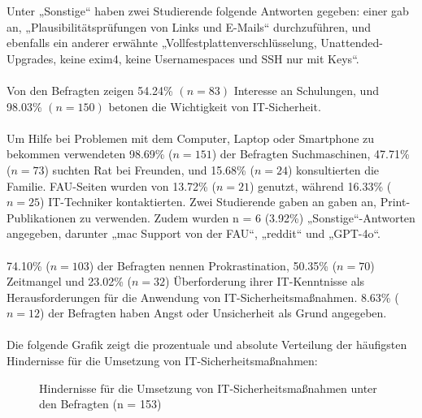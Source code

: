 \documentclass[german,report]{i1thesis}
\begin{document}
Unter „Sonstige“ haben zwei Studierende folgende Antworten gegeben: einer gab an, „Plausibilitätsprüfungen von Links und E-Mails“ durchzuführen, und ebenfalls ein anderer erwähnte „Vollfestplattenverschlüsselung, Unattended-Upgrades, keine exim4, keine Usernamespaces und SSH nur mit Keys“.\\
\\
Von den Befragten zeigen 54.24\% \((n = 83)\) Interesse an Schulungen, und 98.03\% \((n = 150)\) betonen die Wichtigkeit von IT-Sicherheit.\\
\\
Um Hilfe bei Problemen mit dem Computer, Laptop oder Smartphone zu bekommen verwendeten 98.69\% (\(n = 151\)) der Befragten Suchmaschinen, 47.71\% (\(n = 73\)) suchten Rat bei Freunden, und 15.68\% (\(n = 24\)) konsultierten die Familie. FAU-Seiten wurden von 13.72\% (\(n = 21\)) genutzt, während 16.33\% (\(n = 25\)) IT-Techniker kontaktierten. Zwei Studierende gaben an gaben an, Print-Publikationen zu verwenden. Zudem wurden n = 6 (3.92\%) „Sonstige“-Antworten angegeben, darunter „mac Support von der FAU“, „reddit“ und „GPT-4o“.\\
\\
74.10\% (\(n = 103\)) der Befragten nennen Prokrastination, 50.35\% (\(n = 70\)) Zeitmangel und 23.02\% (\(n = 32\)) Überforderung ihrer IT-Kenntnisse als Herausforderungen für die Anwendung von IT-Sicherheitsmaßnahmen. 8.63\% (\(n = 12\)) der Befragten haben Angst oder Unsicherheit als Grund angegeben.\\
\\
Die folgende Grafik zeigt die prozentuale und absolute Verteilung der häufigsten Hindernisse für die Umsetzung von IT-Sicherheitsmaßnahmen:

\begin{figure}[H]
\centering
{}
\caption{Hindernisse für die Umsetzung von IT-Sicherheitsmaßnahmen unter den Befragten (n = 153)}
\label{fig:hindernisse_it_sicherheit_balken}
\end{figure}
\end{document}
